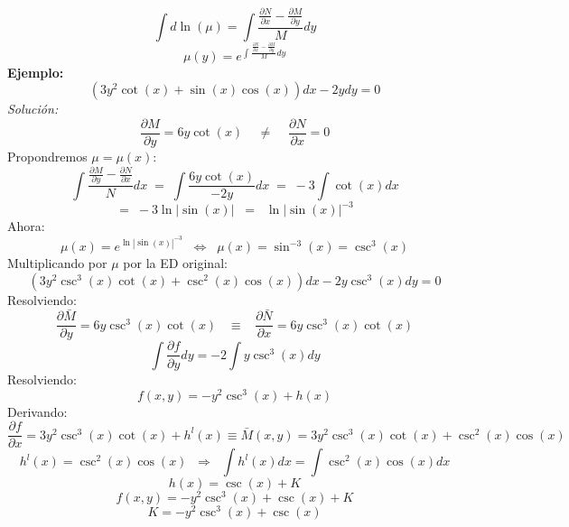 \documentclass[10pt,executivepaper]{article}
\begin{document}
\[\int d\ln(\mu)=\int\frac{\frac{\partial{N}}{\partial{x}}-\frac{\partial{M}}{\partial{y}}}{M}dy\]
\[\mu(y)=e^{\int\frac{\frac{\partial{N}}{\partial{x}}-\frac{\partial{M}}{\partial{y}}}{M}dy}\]
\clearpage
\textbf{Ejemplo:}
\[\left(3y^{2}\cot(x)+\sin(x)\cos(x)\right)dx-2ydy=0\]
\textit{Solución:}
\[\frac{\partial{M}}{\partial{y}}=6y\cot(x)\;\;\;\;\neq\;\;\;\;\frac{\partial{N}}{\partial{x}}=0\]
Propondremos $\mu=\mu(x)$:
\[\int\frac{\frac{\partial{M}}{\partial{y}}-\frac{\partial{N}}{\partial{x}}}{N}dx\;=\;\int\frac{6y\cot(x)}{-2y}dx\;=\;-3\int\cot(x)dx\]
\[=\;-3\ln|\sin(x)|\;\;=\;\;\ln\left|\sin(x)\right|^{-3}\]
Ahora:
\[\mu(x)=e^{\ln\left|\sin(x)\right|^{-3}}\;\;\Leftrightarrow\;\;\mu(x)=\sin^{-3}(x)=\csc^{3}(x)\]
Multiplicando por $\mu$ por la ED original:
\[\left(3y^{2}\csc^{3}(x)\cot(x)+\csc^{2}(x)\cos(x)\right)dx-2y\csc^{3}(x)dy=0\]
Resolviendo:
\[\frac{\partial{\bar{M}}}{\partial{y}}=6y\csc^{3}(x)\cot(x)\;\;\;\equiv\;\;\;\frac{\partial{\bar{N}}}{\partial{x}}=6y\csc^{3}(x)\cot(x)\]
\[\int\frac{\partial{f}}{\partial{y}}dy=-2\int y\csc^{3}(x)dy\]
Resolviendo:
\[f(x,y)=-y^{2}\csc^{3}(x)+h(x)\]
Derivando:
\[\frac{\partial{f}}{\partial{x}}=3y^{2}\csc^{3}(x)\cot(x)+h^{l}(x)\equiv\bar{M}(x,y)=3y^{2}\csc^{3}(x)\cot(x)+\csc^{2}(x)\cos(x)\]
\[h^{l}(x)=\csc^{2}(x)\cos(x)\;\;\Rightarrow\;\;\int h^{l}(x)dx=\int\csc^{2}(x)\cos(x)dx\]
\[h(x)=\csc(x)+K\]
\[f(x,y)=-y^{2}\csc^{3}(x)+\csc(x)+K\]
\[K=-y^{2}\csc^{3}(x)+\csc(x)\]

\printindex
\end{document}
